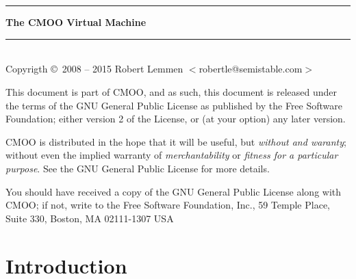 \documentclass[12pt,a4paper]{article}
\begin{document}
\thispagestyle{empty}
~\\~\vspace{3cm}
\begin{center}
\rule{\textwidth}{1pt}\vspace{4mm}
{\Huge\bf The CMOO Virtual Machine}
\rule{\textwidth}{1pt}
\end{center}
\clearpage

\thispagestyle{empty}
~\\
Copyrigth \copyright~2008 -- 2015 Robert Lemmen $<$robertle@semistable.com$>$

This document is part of CMOO, and as such, this document is released under the terms of the GNU General Public License as published by the Free Software Foundation; either version 2 of the License, or (at your option) any later version.

CMOO is distributed in the hope that it will be useful, but {\em without and
waranty}; without even the implied warranty of {\em merchantability} or {\em
fitness for a particular purpose}.  See the GNU General Public License for more details.

You should have received a copy of the GNU General Public License along with
CMOO; if not, write to the Free Software Foundation, Inc., 59 Temple Place, Suite 330, Boston, MA  02111-1307 USA
\cleardoublepage

\tableofcontents
\cleardoublepage

\cleardoublepage

\section{Introduction}\label{sec:introduction}
\end{document}
